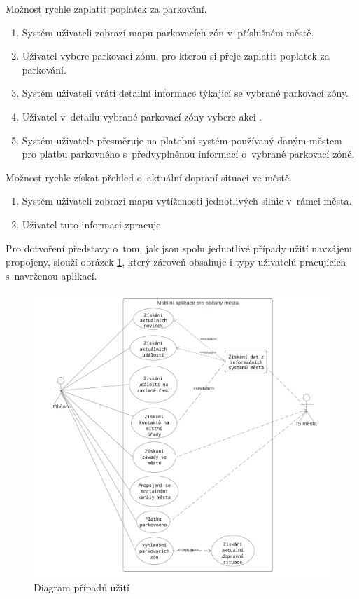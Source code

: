 Možnost rychle zaplatit poplatek za parkování.

\begin{enumerate}
  \item Systém uživateli zobrazí mapu parkovacích zón v~příslušném městě.
  \item Uživatel vybere parkovací zónu, pro kterou si přeje zaplatit poplatek za parkování.
  \item Systém uživateli vrátí detailní informace týkající se vybrané parkovací zóny.
  \item Uživatel v~detailu vybrané parkovací zóny vybere akci .
  \item Systém uživatele přesměruje na platební systém používaný daným městem pro platbu parkovného s~předvyplněnou informací o~vybrané parkovací zóně.
\end{enumerate}

Možnost rychle získat přehled o~aktuální dopraní situaci ve městě.
\begin{enumerate}
  \item Systém uživateli zobrazí mapu vytíženosti jednotlivých silnic v~rámci města.
  \item Uživatel tuto informaci zpracuje.
\end{enumerate}

Pro dotvoření představy o~tom, jak jsou spolu jednotlivé případy užití navzájem propojeny, slouží obrázek \ref{fig:use_case_diagram}, který zároveň 
obsahuje i typy uživatelů pracujících s~navrženou aplikací.


\begin{figure}[H]
  \centering
  \includegraphics[width=.99\textwidth]{Use case diagram.png}
  \caption{Diagram případů užití}
  \label{fig:use_case_diagram}
\end{figure}


